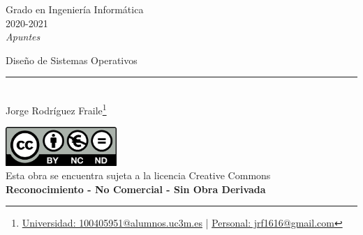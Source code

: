 \documentclass[12pt]{report} %
\begin{document}
	
\begin{titlepage}
	\begin{sffamily}
	\color{azulUC3M}
	\begin{center}
		\begin{figure}[H] %
		\end{figure}
		\vspace{2.5cm}
		\begin{Large}
			Grado en Ingeniería Informática\\			
			2020-2021\\
			\vspace{2cm}		
			\textsl{Apuntes}\\
			\bigskip
		\end{Large}
		 	{\Huge Diseño de Sistemas Operativos}\\
		 	\vspace*{0.5cm}
	 		\rule{10.5cm}{0.1mm}\\
			\vspace*{0.9cm}
			{\LARGE Jorge Rodríguez Fraile\footnote{\href{mailto:100405951@alumnos.uc3m.es}{Universidad: 100405951@alumnos.uc3m.es}  |  \href{mailto:jrf1616@gmail.com}{Personal: jrf1616@gmail.com}}}\\ 
			\vspace*{1cm}
	\end{center}
	\vfill
	\color{black}
		\includegraphics[width=4.2cm]{img/creativecommons.png}\\
		Esta obra se encuentra sujeta a la licencia Creative Commons\\ \textbf{Reconocimiento - No Comercial - Sin Obra Derivada}
	\end{sffamily}
\end{titlepage}


\tableofcontents
\thispagestyle{fancy}
\end{document}
